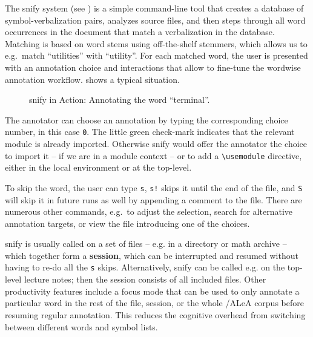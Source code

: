 \documentclass{llncs}
\newcommand\ALeA{\textsf{ALeA}\xspace}
\newcommand\snify{\textsf{snify}\xspace}
\begin{document}
The \snify{}
system (see \cite{stextools:git}) is a simple command-line tool
that creates a database of symbol-verbalization pairs, analyzes \sTeX source files,
and then steps through all word occurrences in the document that match a
verbalization in the database.
Matching is based on word stems using off-the-shelf stemmers, which allows us to
e.g.\ match ``utilities'' with ``utility''.
For each matched word, the user is presented with an annotation choice and
interactions that allow to fine-tune the wordwise annotation workflow. 
shows a typical situation.

\begin{figure}[ht]
  \setlength{\fboxsep}{0pt}
  \caption{\snify in Action: Annotating the word ``terminal''.}\label{fig:snify}
\end{figure}

The annotator can choose an annotation by typing the corresponding choice number,
in this case \lstinline|0|.
The little green check-mark indicates that the relevant module is already imported.
Otherwise \snify would offer the annotator the choice to import it -- if we are
in a module context -- or to add a \lstinline|\usemodule| directive, either in the
local environment or at the top-level.

To skip the word, the user can type \lstinline|s|,
\lstinline|s!| skips it until the end of the file, and \lstinline|S|
will skip it in future runs as well by appending a comment to the file.
There are numerous other commands, e.g.\ to adjust the selection,
search for alternative annotation targets,
or view the file introducing one of the choices.

\snify is usually called on a set of files -- e.g. in a directory or math archive -- which
together form a \textbf{session}, which can be interrupted and resumed without having to
re-do all the \lstinline|s| skips. Alternatively, \snify can be called e.g. on the top-level
lecture notes; then the session consists of all included files. Other productivity
features include a focus mode that can be used to only annotate a particular word in the
rest of the file, session, or the whole \sTeX/\ALeA corpus before resuming regular
annotation. This reduces the cognitive overhead from switching between different 
words and symbol lists.
\end{document}
